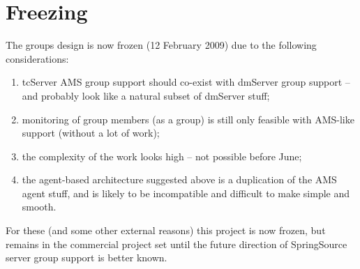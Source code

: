 \documentclass[a4paper,12pt]{article}
\begin{document}
\section{Freezing}
The groups design is now frozen (12 February 2009) due to the following considerations:
\begin{enumerate}
\item tcServer AMS group support should co-exist with dmServer group support -- and probably look like a natural subset of dmServer stuff;
\item monitoring of group members (as a group) is still only feasible with AMS-like support (without a lot of work);
\item the complexity of the work looks high -- not possible before June;
\item the agent-based architecture suggested above is a duplication of the AMS agent stuff, and is likely to be incompatible and difficult to make simple and smooth.
\end{enumerate}

For these (and some other external reasons) this project is now frozen, but remains in the commercial project set until the future direction of SpringSource server group support is better known.
\end{document}
